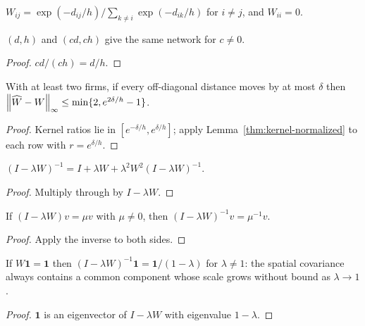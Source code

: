 \begin{definition}\label{def:kernel-exp}
  \leanok
  $W_{ij}=\exp(-d_{ij}/h)/\sum_{k\ne i}\exp(-d_{ik}/h)$ for $i\ne j$, and
  $W_{ii}=0$.
\end{definition}

\begin{lemma}[Scale]\label{thm:kernel-scale}
  \leanok
  $(d,h)$ and $(cd,ch)$ give the same network for $c\ne0$.
\end{lemma}
\begin{proof}\leanok
  $cd/(ch)=d/h$.
\end{proof}

\begin{theorem}\label{thm:kernel-sensitivity}
  \leanok
  With at least two firms, if every off-diagonal distance moves by at most
  $\delta$ then $\left\lVert\widehat W-W\right\rVert_\infty\le\min\{2,e^{2\delta/h}-1\}$.
\end{theorem}
\begin{proof}\leanok
  Kernel ratios lie in $[e^{-\delta/h},e^{\delta/h}]$; apply
  Lemma~\ref{thm:kernel-normalized} to each row with $r=e^{\delta/h}$.
\end{proof}

\begin{lemma}\label{thm:network-expansion}
  \leanok
  $(I-\lambda W)^{-1}=I+\lambda W+\lambda^2W^2(I-\lambda W)^{-1}$.
\end{lemma}
\begin{proof}\leanok
  Multiply through by $I-\lambda W$.
\end{proof}

\begin{lemma}\label{thm:network-eigen}
  \leanok
  If $(I-\lambda W)v=\mu v$ with $\mu\ne0$, then $(I-\lambda
  W)^{-1}v=\mu^{-1}v$.
\end{lemma}
\begin{proof}\leanok
  Apply the inverse to both sides.
\end{proof}

\begin{lemma}\label{thm:network-const}
  \leanok
  If $W\mathbf1=\mathbf1$ then $(I-\lambda W)^{-1}\mathbf1=\mathbf1/(1-\lambda)$
  for $\lambda\ne1$: the spatial covariance always contains a common component
  whose scale grows without bound as $\lambda\to1$.
\end{lemma}
\begin{proof}\leanok
  $\mathbf1$ is an eigenvector of $I-\lambda W$ with eigenvalue $1-\lambda$.
\end{proof}

